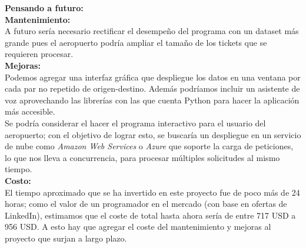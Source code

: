 {\textbf{Pensando a futuro:}}\\

\textbf{Mantenimiento:}\\
A futuro sería necesario rectificar el desempeño del programa con un dataset más grande pues el
aeropuerto podría ampliar el tamaño de los tickets que se requieren procesar.\\

\textbf{Mejoras:}\\
Podemos agregar una interfaz gráfica que despliegue los datos en una ventana por cada par no
repetido de origen-destino. Además podríamos incluir un asistente de voz aprovechando las librerías
con las que cuenta Python para hacer la aplicación más accesible.\\

Se podría considerar el hacer el programa interactivo para el usuario del aeropuerto; con el
objetivo de lograr esto, se buscaría un despliegue en un servicio de nube como \textit{Amazon Web
  Services} o \textit{Azure} que soporte la carga de peticiones, lo que nos lleva a concurrencia,
para procesar múltiples solicitudes al mismo tiempo.\\

\textbf{Costo:}\\
El tiempo aproximado que se ha invertido en este proyecto fue de poco más de 24 horas; como el
valor de un programador en el mercado (con base en ofertas de LinkedIn), estimamos que el coste de
total hasta ahora sería de entre 717 USD a 956 USD. A esto hay que agregar el coste del
mantenimiento y mejoras al proyecto que surjan a largo plazo.
